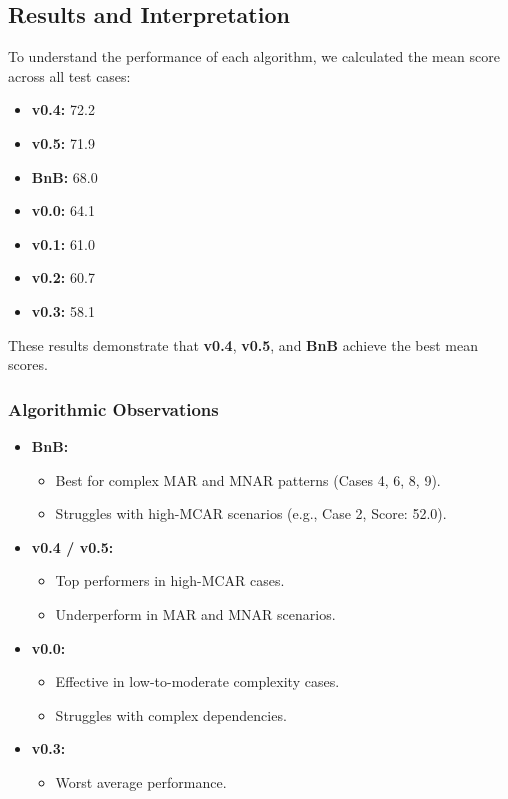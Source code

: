 \documentclass[a4paper,12pt]{article}
\begin{document}
\subsection{Results and Interpretation}
To understand the performance of each algorithm, we calculated the mean score across all test cases:  
\begin{itemize}
\item \textbf{v0.4:} 72.2
\item \textbf{v0.5:} 71.9
\item \textbf{BnB:} 68.0
\item \textbf{v0.0:} 64.1
\item \textbf{v0.1:} 61.0
\item \textbf{v0.2:} 60.7
\item \textbf{v0.3:} 58.1
\end{itemize}
These results demonstrate that \textbf{v0.4}, \textbf{v0.5}, and \textbf{BnB} achieve the best mean scores. 

\subsubsection{Algorithmic Observations}
\begin{itemize}
\item \textbf{BnB:}
\begin{itemize}
\item Best for complex MAR and MNAR patterns (Cases 4, 6, 8, 9).
\item Struggles with high-MCAR scenarios (e.g., Case 2, Score: 52.0).
\end{itemize}
\item \textbf{v0.4 / v0.5:}
\begin{itemize}
\item Top performers in high-MCAR cases.
\item Underperform in MAR and MNAR scenarios.
\end{itemize}
\item \textbf{v0.0:}
\begin{itemize}
\item Effective in low-to-moderate complexity cases.
\item Struggles with complex dependencies.
\end{itemize}
\item \textbf{v0.3:}
\begin{itemize}
\item Worst average performance.
\end{itemize}
\end{itemize}
\end{document}
